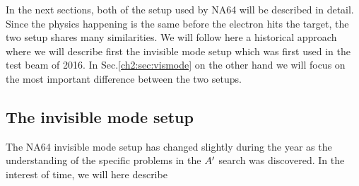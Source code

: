 In the next sections, both of the setup used by NA64 will be described in detail. Since the physics happening is the same before the electron hits the target, the two setup shares many similarities. We will follow here a historical approach where we will describe first the invisible mode setup which was first used in the test beam of 2016. In Sec.\ref{ch2:sec:vismode} on the other hand we will focus on the most important difference between the two setups.

\subsection{The invisible mode setup}
\label{ch2:sec:invismode}

The NA64 invisible mode setup has changed slightly during the year as the understanding of the specific problems in the $A'$ search was discovered. In the interest of time, we will here describe 

